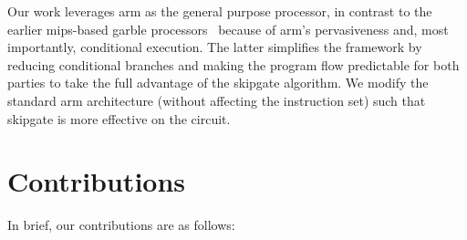Our work leverages \gls{arm} as the general purpose processor, in contrast to the earlier \gls{mips}-based garble processors~\cite{songhori2015tinygarble, wang2016secure, songhori2016garbledcpu} because of \gls{arm}'s pervasiveness and, most importantly, conditional execution.
The latter simplifies the framework by reducing conditional branches and making the program flow predictable for both parties to take the full advantage of the \gls{skipgate} algorithm.
We modify the standard \gls{arm} architecture (without affecting the instruction set) such that \gls{skipgate} is more effective on the circuit.

\section{Contributions}
In brief, our contributions are as follows:
